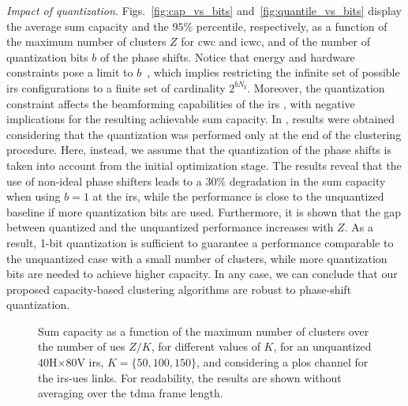 \emph{Impact of quantization.} Figs.~\ref{fig:cap_vs_bits} and~\ref{fig:quantile_vs_bits} display the average sum capacity and the $95\%$ percentile, respectively, as a function of the maximum number of clusters $Z$ for \gls{cwc} and \gls{icwc}, and of the number of quantization bits $b$ of the phase shifts. 
Notice that energy and hardware constraints pose a limit to $b$~\cite{rivera2022optimization}, which implies restricting the infinite set of possible \gls{irs} configurations to a finite set of cardinality $2^{bN_{\mathrm I}}$. 
Moreover, the quantization constraint affects the beamforming capabilities of the \gls{irs} \cite{abeywickrama2020intelligent}, with negative implications for the resulting achievable sum capacity.
In \cite{rech2023downlink}, results were obtained considering that the quantization was performed only at the end of the clustering procedure. Here, instead, we assume that the quantization of the phase shifts is taken into account from the initial optimization stage.
The results reveal that the use of non-ideal phase shifters leads to a $30\%$ degradation in the sum capacity when using $b=1$ at the \gls{irs}, while the performance is close to the unquantized baseline if more quantization bits are used.
Furthermore, it is shown that the gap between quantized and the unquantized performance increases with $Z$. As a result, 1-bit quantization is sufficient to guarantee a performance comparable to the unquantized case with a small number of clusters, while more quantization bits are needed to achieve higher capacity.
In any case, we can conclude that our proposed capacity-based clustering algorithms are robust to phase-shift quantization. 

\begin{figure}[t!]
    \centering
    \setlength{}
    \setlength{}
    
    \caption{Sum capacity as a function of the maximum number of clusters over the number of \glspl{ue} $Z/K$, for different values of $K$, for an unquantized $40$H$\times80$V \gls{irs}, $K = \{50, 100, 150\}$, and considering a \gls{plos} channel for the \gls{irs}-\glspl{ue} links. For readability, the results are shown without averaging over the \gls{tdma} frame length.}
    \label{fig:sumcap_vs_ZK}
\end{figure}

